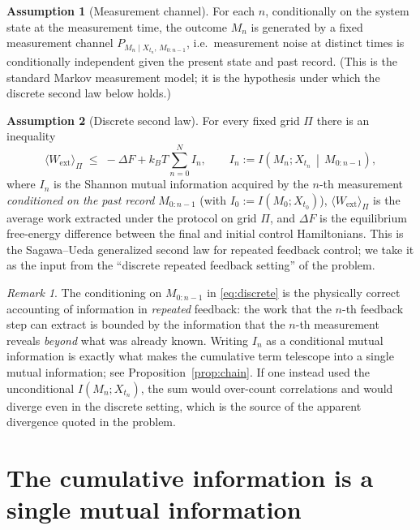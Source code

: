 \documentclass{amsart}
\theoremstyle{definition}
\newtheorem{assumption}{Assumption}
\theoremstyle{remark}
\newtheorem{remark}{Remark}
\newcommand{\kB}{k_{B}}
\newcommand{\Wext}{W_{\mathrm{ext}}}
\newcommand{\DF}{\Delta F}
\begin{document}
\begin{assumption}[Measurement channel]\label{ass:channel}
For each $n$, conditionally on the system state at the measurement time,
the outcome $M_n$ is generated by a fixed measurement channel
$P_{M_n\mid X_{t_n},\,M_{0:n-1}}$, i.e.\ measurement noise at distinct
times is conditionally independent given the present state and past
record. (This is the standard Markov measurement model; it is the
hypothesis under which the discrete second law below holds.)
\end{assumption}

\begin{assumption}[Discrete second law]\label{ass:discrete}
For every fixed grid $\Pi$ there is an inequality
\begin{equation}\label{eq:discrete}
\langle\Wext\rangle_\Pi\;\le\;-\DF+\kB T\sum_{n=0}^{N}I_n ,
\qquad
I_n:=I\!\left(M_n;X_{t_n}\,\middle|\,M_{0:n-1}\right),
\end{equation}
where $I_n$ is the Shannon mutual information acquired by the $n$-th
measurement \emph{conditioned on the past record}
$M_{0:n-1}$ (with $I_0:=I(M_0;X_{t_0})$), $\langle\Wext\rangle_\Pi$ is
the average work extracted under the protocol on grid $\Pi$, and $\DF$ is
the equilibrium free-energy difference between the final and initial
control Hamiltonians. This is the Sagawa--Ueda generalized second law
for repeated feedback control; we take it as the input from the
``discrete repeated feedback setting'' of the problem.
\end{assumption}

\begin{remark}\label{rem:conditional}
The conditioning on $M_{0:n-1}$ in \eqref{eq:discrete} is the physically
correct accounting of information in \emph{repeated} feedback: the work
that the $n$-th feedback step can extract is bounded by the information
that the $n$-th measurement reveals \emph{beyond} what was already
known. Writing $I_n$ as a conditional mutual information is exactly what
makes the cumulative term telescope into a single mutual information; see
Proposition~\ref{prop:chain}. If one instead used the unconditional
$I(M_n;X_{t_n})$, the sum would over-count correlations and would diverge
even in the discrete setting, which is the source of the apparent
divergence quoted in the problem.
\end{remark}

\section{The cumulative information is a single mutual information}
\end{document}
